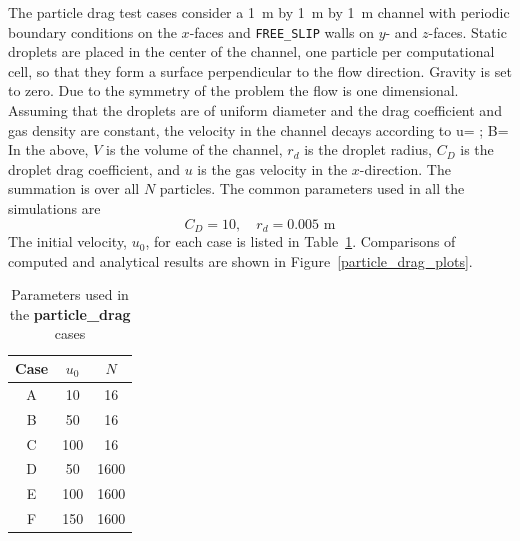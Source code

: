\documentclass[11pt]{book}
\newcommand{\ct}{\tt\small}
\begin{document}
The particle drag test cases consider a 1~m by 1~m by 1~m
channel with periodic boundary conditions on the $x$-faces and {\ct FREE\_SLIP}
walls on $y$- and $z$-faces. Static droplets are placed in the center
of the channel, one particle per computational cell, so that they form a surface
perpendicular to the flow direction. Gravity is set to zero. Due to the symmetry of the problem the flow is one
dimensional. Assuming that the droplets are of uniform diameter  and
the drag coefficient and gas density are constant, the velocity in
the channel decays according to
\be u=  \quad ; \quad B= \ee
In the above, $V$ is the volume of the channel, $r_{d}$ is the droplet radius, $C_{D}$
is the droplet drag coefficient, and $u$ is the gas velocity in the $x$-direction. The summation is
over all $N$ particles.
The common parameters used in all the simulations are
\[
    C_D=10, \quad r_d=0.005\mbox{ m}
\]
The initial velocity, $u_0$, for each case is listed in Table~\ref{particle_drag_parameters}.
Comparisons of computed and analytical results are shown in Figure~\ref{particle_drag_plots}.
\begin{table}[ht]
\begin{center}
\caption{Parameters used in the {\bf particle\_drag} cases}
\label{particle_drag_parameters}
\begin{tabular}{|c|c|c|}
\hline
Case & $u_{0}$ & $N$\tabularnewline
\hline
\hline
A & 10 & 16 \tabularnewline
\hline
B & 50 & 16\tabularnewline
\hline
C & 100 & 16\tabularnewline
\hline
D & 50  & 1600\tabularnewline
\hline
E & 100 & 1600\tabularnewline
\hline
F & 150 & 1600 \tabularnewline
\hline
\end{tabular}
\end{center}
\end{table}
\end{document}
